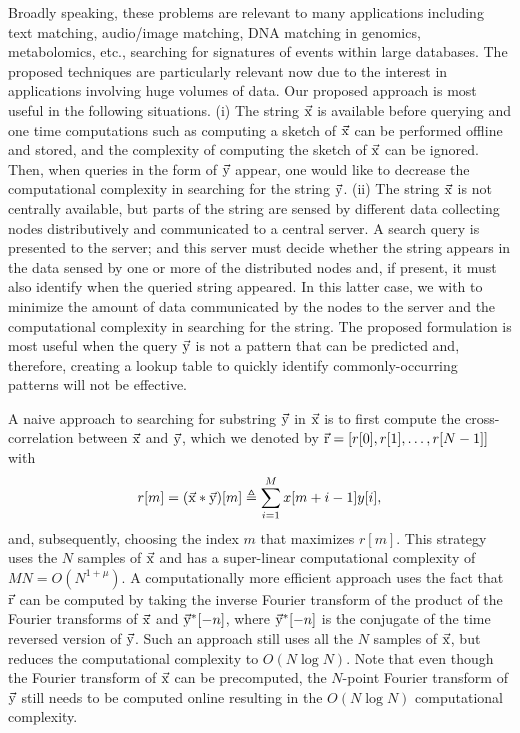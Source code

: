Broadly speaking, these problems are relevant to many applications including text matching, audio/image matching, DNA matching in genomics, metabolomics, etc., searching for signatures of events within large databases. The proposed techniques are particularly relevant now due to the interest in applications involving huge volumes of data. Our proposed approach is most useful in the following situations.
(i) The string $\vec{\mathrm{x}}$ is available before querying and one time computations such as computing a sketch of $\vec{\mathrm{x}}$ can be performed offline and stored, and the complexity of computing the sketch of $\vec{\mathrm{x}}$ can be ignored. Then, when queries in the form of $\vec{\mathrm{y}}$ appear, one would like to decrease the computational complexity in searching for the string $\vec{\mathrm{y}}$. (ii) The string $\vec{\mathrm{x}}$ is not centrally available, but parts of the string are sensed by different data collecting nodes distributively and communicated to a central server. A search query is presented to the server; and this server must decide whether the string appears in the data sensed by one or more of the distributed nodes and, if present, it must also identify when the queried string appeared.
In this latter case, we with to minimize the amount of data communicated by the nodes to the server and the computational complexity in searching for the string.
The proposed formulation is most useful when the query $\vec{\mathrm{y}}$ is not a pattern that can be predicted and, therefore, creating a lookup table to quickly identify commonly-occurring patterns will not be effective.

A naive approach to searching for substring $\vec{\mathrm{y}}$ in $\vec{\mathrm{x}}$ is to first compute the cross-correlation between $\vec{\mathrm{x}}$ and $\vec{\mathrm{y}}$, which we denoted by $\vec{\mathrm{r}}=[r[0], r[1],\ldots, r[N-1]]$ with
\begin{align}
\label{Eqn:DefCrossCorrelation}
r[m]=(\vec{\mathrm{x}}*\vec{\mathrm{y}})[m] \triangleq \sum_{i=1}^{M} x[m+i-1] y[i] ,
\end{align}
and, subsequently,  choosing the index $m$ that maximizes $r[m]$.
This strategy uses the $N$ samples of $\vec{\mathrm{x}}$ and has a super-linear computational complexity of $MN = O(N^{1+\mu})$. A computationally more efficient approach uses the fact that $\vec{\mathrm{r}}$ can be computed by taking the inverse Fourier transform of the product of the Fourier transforms of $\vec{\mathrm{x}}$ and $ \vec{\mathrm{y}}^*[-n]$, where $\vec{\mathrm{y}}^*[-n]$ is the conjugate of the time reversed version of $\vec{\mathrm{y}}$.
Such an approach still uses all the $N$ samples of $\vec{\mathrm{x}}$, but reduces the computational complexity to $O(N \log N)$. Note that even though the Fourier transform of $\vec{\mathrm{x}}$ can be precomputed, the $N$-point Fourier transform of $\vec{\mathrm{y}}$ still needs to be computed online resulting in the $O(N \log N)$ computational complexity.

